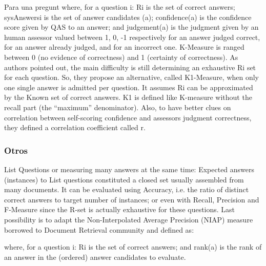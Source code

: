 Para una pregunt
where, for a question i: Ri 
is the set of correct answers; 
sysAnswersi
 is the set of answer candidates (a); confidence(a) 
is the confidence score given by QAS to an answer; and 
judgement(a) is the judgment given by an human assessor 
valued between {1, 0, -1} respectively for an answer judged 
correct, for an answer already judged, and for an incorrect 
one. K-Measure is ranged between 0 (no evidence of 
correctness) and 1 (certainty of correctness). As authors 
pointed out, the main difficulty is still determining an 
exhaustive Ri
 set for each question. So, they propose an 
alternative, called K1-Measure, when only one single answer 
is admitted per question. It assumes Ri
 can be approximated 
by the Known set of correct answers. K1 is defined like 
K-measure without the recall part (the “maximum” 
denominator). Also, to have better clues on correlation 
between self-scoring confidence and assessors judgment 
correctness, they defined a correlation coefficient called r. 

\subsubsection*{Otros}
List Questions or measuring many answers at the same 
time: Expected answers (instances) to List questions 
constituted a closed set usually assembled from many 
documents. It can be evaluated using Accuracy, i.e. the ratio 
of distinct correct answers to target number of instances; or 
even with Recall, Precision and F-Measure since the R-set is 
actually exhaustive for these questions. Last possibility is to 
adapt the Non-Interpolated Average Precision (NIAP) 
measure borrowed to Document Retrieval community and 
defined as: 
 
where, for a question i: Ri 
is the set of correct answers; 
and rank(a) is the rank of an answer in the (ordered) answer 
candidates to evaluate. 


